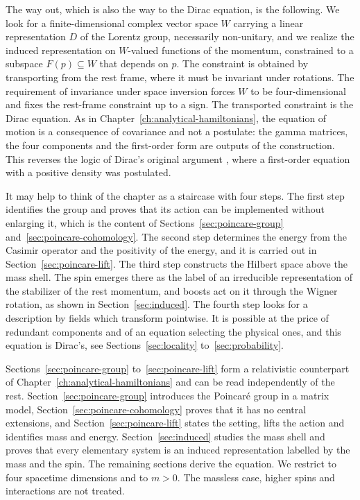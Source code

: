 	The way out, which is also the way to the Dirac equation, is the following. We look for a finite-dimensional complex vector space $W$ carrying a linear representation $D$ of the Lorentz group, necessarily non-unitary, and we realize the induced representation on $W$-valued functions of the momentum, constrained to a subspace $F(p)\subseteq W$ that depends on $p$. The constraint is obtained by transporting from the rest frame, where it must be invariant under rotations. The requirement of invariance under space inversion forces $W$ to be four-dimensional and fixes the rest-frame constraint up to a sign. The transported constraint is the Dirac equation. As in Chapter~\ref{ch:analytical-hamiltonians}, the equation of motion is a consequence of covariance and not a postulate: the gamma matrices, the four components and the first-order form are outputs of the construction. This reverses the logic of Dirac's original argument \cite[TODO-location]{TODO-Dirac1928}, where a first-order equation with a positive density was postulated.
	
	It may help to think of the chapter as a staircase with four steps. The first step identifies the group and proves that its action can be implemented without enlarging it, which is the content of Sections~\ref{sec:poincare-group} and~\ref{sec:poincare-cohomology}. The second step determines the energy from the Casimir operator and the positivity of the energy, and it is carried out in Section~\ref{sec:poincare-lift}. The third step constructs the Hilbert space above the mass shell. The spin emerges there as the label of an irreducible representation of the stabilizer of the rest momentum, and boosts act on it through the Wigner rotation, as shown in Section~\ref{sec:induced}. The fourth step looks for a description by fields which transform pointwise. It is possible at the price of redundant components and of an equation selecting the physical ones, and this equation is Dirac's, see Sections~\ref{sec:locality} to~\ref{sec:probability}.
	
	Sections~\ref{sec:poincare-group} to~\ref{sec:poincare-lift} form a relativistic counterpart of Chapter~\ref{ch:analytical-hamiltonians} and can be read independently of the rest. Section~\ref{sec:poincare-group} introduces the Poincar\'e group in a matrix model, Section~\ref{sec:poincare-cohomology} proves that it has no central extensions, and Section~\ref{sec:poincare-lift} states the setting, lifts the action and identifies mass and energy. Section~\ref{sec:induced} studies the mass shell and proves that every elementary system is an induced representation labelled by the mass and the spin. The remaining sections derive the equation. We restrict to four spacetime dimensions and to $m>0$. The massless case, higher spins and interactions are not treated.
	
